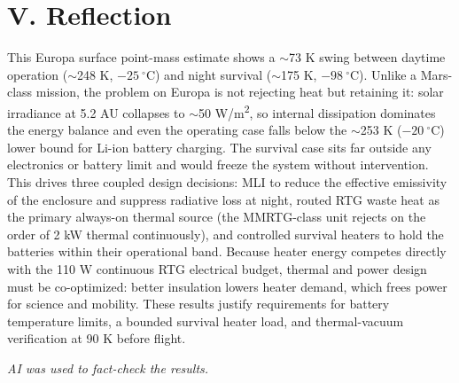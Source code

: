\documentclass[11pt]{article}
\begin{document}
\section*{V. Reflection}
This Europa surface point-mass estimate shows a $\sim$73 K swing between daytime operation ($\sim$248 K, $-25\ ^\circ$C) and night survival ($\sim$175 K, $-98\ ^\circ$C). Unlike a Mars-class mission, the problem on Europa is not rejecting heat but retaining it: solar irradiance at 5.2 AU collapses to $\sim$50 W/m\textsuperscript{2}, so internal dissipation dominates the energy balance and even the operating case falls below the $\sim$253 K ($-20\ ^\circ$C) lower bound for Li-ion battery charging. The survival case sits far outside any electronics or battery limit and would freeze the system without intervention. This drives three coupled design decisions: MLI to reduce the effective emissivity of the enclosure and suppress radiative loss at night, routed RTG waste heat as the primary always-on thermal source (the MMRTG-class unit rejects on the order of 2 kW thermal continuously), and controlled survival heaters to hold the batteries within their operational band. Because heater energy competes directly with the 110 W continuous RTG electrical budget, thermal and power design must be co-optimized: better insulation lowers heater demand, which frees power for science and mobility. These results justify requirements for battery temperature limits, a bounded survival heater load, and thermal-vacuum verification at 90 K before flight.

\vspace{0.5em}
\noindent\textit{AI was used to fact-check the results.}
\end{document}
